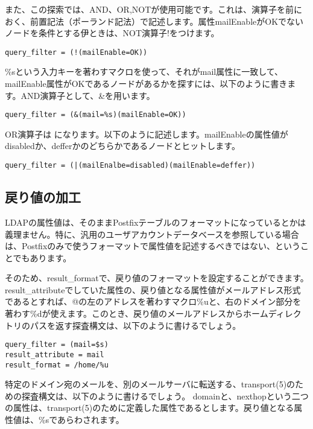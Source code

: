また、この探索では、AND、OR,NOTが使用可能です。これは、演算子を前におく、前置記法（ポーランド記法）で記述します。属性mailEnableがOKでないノードを条件とする伊ときは、NOT演算子!をつけます。

\begin{verbatim}
query_filter = (!(mailEnable=OK))
\end{verbatim}

\%sという入力キーを著わすマクロを使って、それがmail属性に一致して、mailEnable属性がOKであるノードがあるかを探すには、以下のように書きます。AND演算子として、\&を用います。

\begin{verbatim}
query_filter = (&(mail=%s)(mailEnable=OK))
\end{verbatim}

OR演算子は
\textbar
になります。以下のように記述します。mailEnableの属性値がdisabledか、defferかのどちらかであるノードとヒットします。

\begin{verbatim}
query_filter = (|(mailEnalbe=disabled)(mailEnable=deffer))
\end{verbatim}



\subsection{戻り値の加工}

LDAPの属性値は、そのままPostfixテーブルのフォーマットになっているとかは義理ません。特に、汎用のユーザアカウントデータベースを参照している場合は、Postfixのみで使うフォーマットで属性値を記述するべきではない、ということでもあります。

そのため、result\_formatで、戻り値のフォーマットを設定することができます。result\_attributeでしていた属性の、戻り値となる属性値がメールアドレス形式であるとすれば、@の左のアドレスを著わすマクロ\%uと、右のドメイン部分を著わす\%dが使えます。このとき、戻り値のメールアドレスからホームディレクトリのパスを返す探査構文は、以下のように書けるでしょう。

\begin{verbatim}
query_filter = (mail=$s)
result_attribute = mail
result_format = /home/%u
\end{verbatim}

特定のドメイン宛のメールを、別のメールサーバに転送する、transport(5)のための探査構文は、以下のように書けるでしょう。
domainと、nexthopという二つの属性は、transport(5)のために定義した属性であるとします。戻り値となる属性値は、\%sであらわされます。

